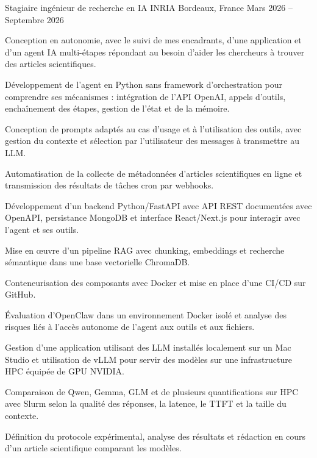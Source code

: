 
\begin{cventries}
  \cventry
    {Stagiaire ingénieur de recherche en IA}
    {INRIA}
    {Bordeaux, France}
    {Mars 2026 -- Septembre 2026}
    {
      \begin{cvitems}
        \item {Conception en autonomie, avec le suivi de mes encadrants, d’une application et d’un agent IA multi-étapes répondant au besoin d’aider les chercheurs à trouver des articles scientifiques.}
        \item {Développement de l’agent en Python sans framework d’orchestration pour comprendre ses mécanismes : intégration de l’API OpenAI, appels d’outils, enchaînement des étapes, gestion de l’état et de la mémoire.}
        \item {Conception de prompts adaptés au cas d’usage et à l’utilisation des outils, avec gestion du contexte et sélection par l’utilisateur des messages à transmettre au LLM.}
        \item {Automatisation de la collecte de métadonnées d’articles scientifiques en ligne et transmission des résultats de tâches cron par webhooks.}
        \item {Développement d’un backend Python/FastAPI avec API REST documentées avec OpenAPI, persistance MongoDB et interface React/Next.js pour interagir avec l’agent et ses outils.}
        \item {Mise en œuvre d’un pipeline RAG avec chunking, embeddings et recherche sémantique dans une base vectorielle ChromaDB.}
        \item {Conteneurisation des composants avec Docker et mise en place d’une CI/CD sur GitHub.}
        \item {Évaluation d’OpenClaw dans un environnement Docker isolé et analyse des risques liés à l’accès autonome de l’agent aux outils et aux fichiers.}
        \item {Gestion d’une application utilisant des LLM installés localement sur un Mac Studio et utilisation de vLLM pour servir des modèles sur une infrastructure HPC équipée de GPU NVIDIA.}
        \item {Comparaison de Qwen, Gemma, GLM et de plusieurs quantifications sur HPC avec Slurm selon la qualité des réponses, la latence, le TTFT et la taille du contexte.}
        \item {Définition du protocole expérimental, analyse des résultats et rédaction en cours d’un article scientifique comparant les modèles.}
      \end{cvitems}
    }


\end{cventries}
